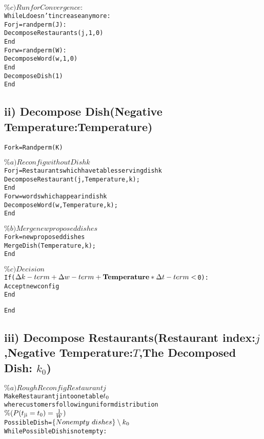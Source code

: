 \documentclass{article}
\begin{document}
\begin{spacing}{1.1}
\begin{alltt}
  \(\%c)Run for Convergence:\)
      While L doesn't increase any more:          
          For j=randperm(J):
              Decompose Restaurants(j,1,0)
          End
          For w=randperm(W):
              Decompose Word(w,1,0)
          End
          Decompose Dish(1)
      End
\end{alltt}
\subsection{ii) Decompose Dish(Negative Temperature:Temperature)}
\begin{alltt}
For k=Randperm(K)

   \(\%a)Reconfig without Dish k\)
      For j=Restaurants which have tables serving dish k
          Decompose Restaurant(j,Temperature,k);
      End
      For w=words which appear in dish k
          Decompose Word(w,Temperature,k);
      End

   \(\%b)Merge new proposed dishes\)
      For k=new proposed dishes
          Merge Dish(Temperature,k);
      End      
  
   \(\%c)Decision\)
      If(\(\Delta k-term+\Delta w-term+{\bf Temperature}*\Delta t-term<\)0):
          Accept new config
      End

End
\end{alltt}
\subsection{iii) Decompose Restaurants(Restaurant index:$j$,Negative Temperature:$T$,The Decomposed Dish: $k_{0}$)}
\begin{alltt}
\(\%a)Rough Reconfig Restaurant j\)
Make Restaurant j into one table \(t\textsubscript{0}\) where customers following uniform distribution
\(\%(P(t\textsubscript{ji}=t\textsubscript{0})=\frac{1}{W})\)      
Possible Dish=\(\{Nonempty \ dishes\}\setminus k\textsubscript{0}\)      
While Possible Dish is not empty: 
      

\end{alltt}
\end{spacing}
\end{document}
